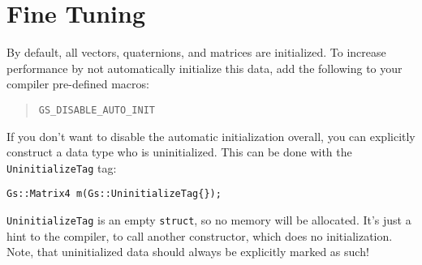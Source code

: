 \documentclass{article}
\begin{document}

\section*{Fine Tuning}

By default, all vectors, quaternions, and matrices are initialized. To increase performance by not automatically
initialize this data, add the following to your compiler pre-defined macros:
\begin{quote}
\texttt{GS\_DISABLE\_AUTO\_INIT}
\end{quote}
If you don't want to disable the automatic initialization overall, you can explicitly construct a data type
who is uninitialized. This can be done with the \texttt{UninitializeTag} tag:
\begin{lstlisting}
Gs::Matrix4 m(Gs::UninitializeTag{});
\end{lstlisting}
\texttt{UninitializeTag} is an empty \texttt{struct}, so no memory will be allocated. It's just a hint to the compiler,
to call another constructor, which does no initialization.
Note, that uninitialized data should always be explicitly marked as such!
\end{document}
